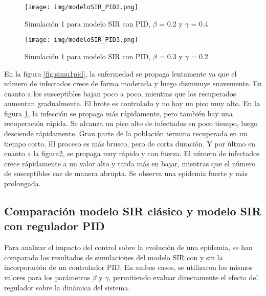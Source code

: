 \begin{figure}[H]
    \centering
    \texttt{[image: img/modeloSIR\_PID2.png]}
    \caption{Simulación 1 para modelo SIR con PID, $\beta$ = 0.2 y $\gamma$ = 0.4}
    \label{fig:simu2pid}
    \vspace{0.5cm} %
\end{figure}

\begin{figure}[H]
    \centering
    \texttt{[image: img/modeloSIR\_PID3.png]}
    \caption{Simulación 1 para modelo SIR con PID, $\beta$ = 0.3 y $\gamma$ = 0.2}
    \label{fig:simu3pid}
    \vspace{0.5cm} %
\end{figure}

En la figura \ref{fig:simu1pid}, la enfermedad se propaga lentamente ya que el número de infectados crece de forma moderada y luego disminuye suavemente. En cuanto a los susceptibles bajan poco a poco, mientras que los recuperados aumentan gradualmente. El brote es controlado y no hay un pico muy alto. En la figura \ref{fig:simu2pid}, la infección se propaga más rápidamente, pero también hay una recuperación rápida. Se alcanza un pico alto de infectados en poco tiempo, luego desciende rápidamente.
Gran parte de la población termina recuperada en un tiempo corto. El proceso es más brusco, pero de corta duración. Y por últmo en cuanto a la figura\ref{fig:simu3pid}, se propaga muy rápido y con fuerza. El número de infectados crece rápidamente a un valor alto y tarda más en bajar, mientras que el número de susceptibles cae de manera abrupta. Se observa una epidemia fuerte y más prolongada.


\subsection{Comparación modelo SIR clásico y modelo SIR con regulador PID}
Para analizar el impacto del control sobre la evolución de una epidemia, se han comparado los resultados de simulaciones del modelo SIR con y sin la incorporación de un controlador PID. En ambos casos, se utilizaron los mismos valores para los parámetros $\beta$ y $\gamma$, permitiendo evaluar directamente el efecto del regulador sobre la dinámica del sistema.

